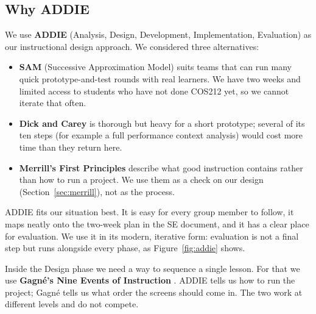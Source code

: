 \documentclass[11pt,a4paper]{article}
\begin{document}
\subsection{Why ADDIE}

We use \textbf{ADDIE} (Analysis, Design, Development, Implementation, Evaluation)
\cite{branch2009} as our instructional design approach. We considered three alternatives:

\begin{itemize}
  \item \textbf{SAM} (Successive Approximation Model) suits teams that can run many quick
        prototype-and-test rounds with real learners. We have two weeks and limited access to
        students who have not done COS212 yet, so we cannot iterate that often.
  \item \textbf{Dick and Carey} is thorough but heavy for a short prototype; several of its ten
        steps (for example a full performance context analysis) would cost more time than they
        return here.
  \item \textbf{Merrill's First Principles} \cite{merrill2002} describe what good instruction
        contains rather than how to run a project. We use them as a check on our design
        (Section~\ref{sec:merrill}), not as the process.
\end{itemize}

ADDIE fits our situation best. It is easy for every group member to follow, it maps neatly onto
the two-week plan in the SE document, and it has a clear place for evaluation. We use it in its
modern, iterative form: evaluation is not a final step but runs alongside every phase, as
Figure~\ref{fig:addie} shows.

Inside the Design phase we need a way to sequence a single lesson. For that we use
\textbf{Gagné's Nine Events of Instruction} \cite{gagne2005}. ADDIE tells us how to run the project;
Gagné tells us what order the screens should come in. The two work at different levels and do not
compete.
\end{document}

